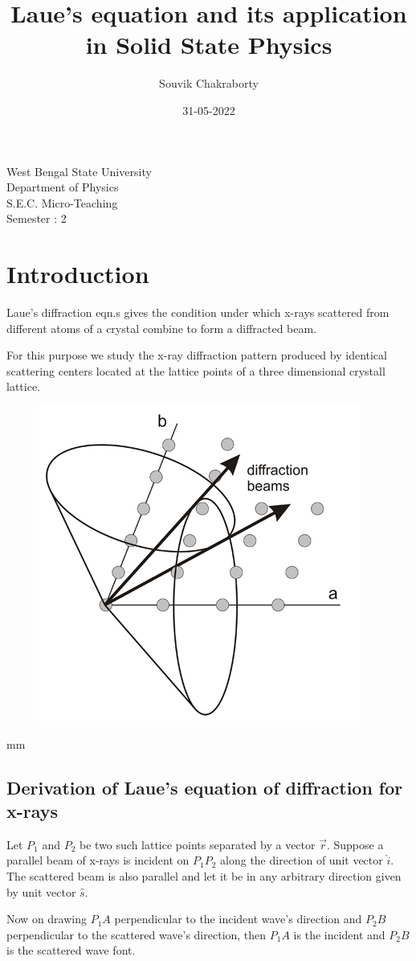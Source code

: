 \documentclass[12pt]{article}
\title {Laue's equation and its application in Solid State Physics}
\date {31-05-2022}
\author {Souvik Chakraborty}
\begin{document}
\maketitle
\begin {center}

West Bengal State University\\
Department of Physics\\
S.E.C. Micro-Teaching \\
Semester : 2
\end{center}

\section {Introduction}
Laue's diffraction eqn.s gives the condition under which x-rays scattered from different atoms of a crystal combine to form a diffracted beam. 

For this purpose we study the x-ray diffraction pattern produced by identical scattering centers located at the lattice points of a three dimensional crystall lattice.

\begin{figure}[h!]
  \centering \includegraphics[width= 4 cm] {laue.jpg}
\end{figure}

 mm

\subsection {Derivation of Laue's equation of diffraction for x-rays}
Let $P_1$ and $P_2$ be two such lattice points separated by a vector $\vec{r}$. 
Suppose a parallel beam of x-rays is incident on $P_1P_2$ along the direction of unit vector $\hat{i}$.
The scattered beam is also parallel and let it be in any arbitrary direction given by unit vector $\hat{s}$.

Now on drawing $P_1A$ perpendicular to the incident wave's direction and $P_2B$ perpendicular to the scattered wave's direction, then $P_1A$ is the incident and $P_2B$ is the scattered wave font.
\end{document}
